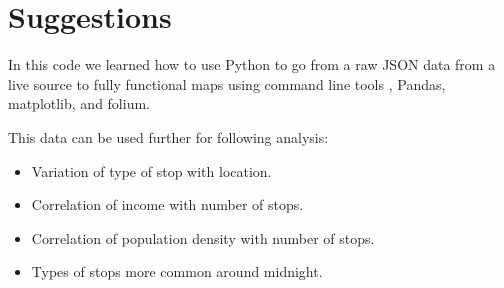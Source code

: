 \documentclass[11pt,oneside]{article}
\begin{document}
{\begin{itemize}
\end{itemize}
}

\section{Suggestions}
{\color{black}
In this code we learned how to use Python to go from a raw JSON data from a live source to fully functional maps using command line tools , Pandas, matplotlib, and folium.

This data can be used further for following analysis:
\begin{itemize}
	\item Variation of type of stop with location.
     	\item Correlation of income with number of stops.
     	\item Correlation of population density with number of stops.
     	\item Types of stops more common around midnight.

\end{itemize}

}
\end{document}
